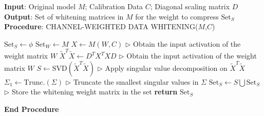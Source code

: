 \documentclass[11pt]{article}
\begin{document}
\begin{algorithm*}[ht]
    \caption{Pseudocode of Channel-weighted data whitening}
    \textbf{Input}: Original model $M$; Calibration Data $C$; Diagonal scaling matrix $D$ \\
    \textbf{Output}: Set of whitening matrices in $M$ for the weight to compress  $\text{Set}_S$\\
    \textbf{Procedure}: CHANNEL-WEIGHTED DATA WHITENING($M$,$C$)
    
    \begin{algorithmic}[1] %
        \State $\text{Set}_S \gets \phi$ \hfill {}
        \State $\text{Set}_{W} \gets M$ \hfill {}
            \State $X \gets M(W,C)$\; \hfill{$\triangleright$ Obtain the input activation of the weight matrix $W$}
            \State $\tilde{X}^T \tilde{X} \gets D^TX^TXD$ \hfill{$\triangleright$ Obtain the input activation of the weight matrix $W$}
            \State $S \gets \text{SVD}(\tilde{X}^T\tilde{X})$ \hfill {$\triangleright$ Apply singular value decomposition on $\tilde{X}^T\tilde{X}$}
            \State $\Sigma_1 \gets \text{Trunc.}(\Sigma)$ \hfill {$\triangleright$ Truncate the smallest singular values in $\Sigma$}
            \State $\text{Set}_{S} \gets S \bigcup \text{Set}_{S}$ \hfill {$\triangleright$ Store the whitening weight matrix in the set}
        \EndFor
        \State \textbf{return} $\text{Set}_S$
    \end{algorithmic}
\textbf{End Procedure}
\label{algorithm2}
\end{algorithm*}
\end{document}
